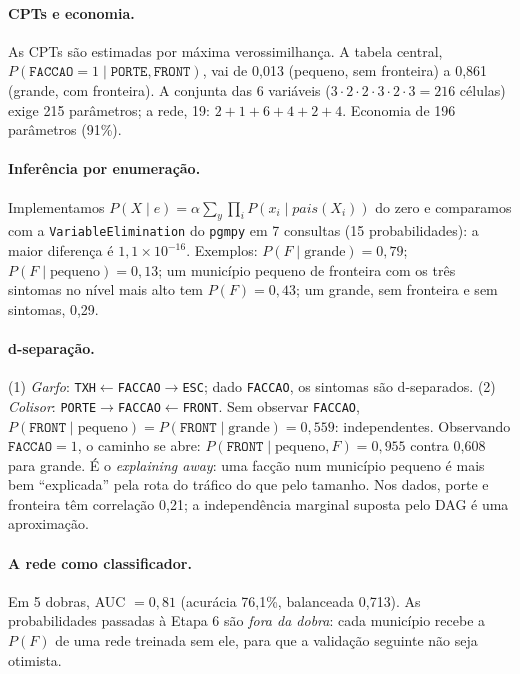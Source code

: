 \documentclass[article,12pt,oneside,a4paper,brazil,sumario=tradicional]{abntex2}
\newcommand{\F}{\texttt{FACCAO}}
\begin{document}
\paragraph{CPTs e economia.} As CPTs são estimadas por máxima verossimilhança. A tabela
central, $P(\F{=}1\mid\texttt{PORTE},\texttt{FRONT})$, vai de 0,013 (pequeno, sem fronteira)
a 0,861 (grande, com fronteira). A conjunta das 6 variáveis ($3\cdot2\cdot2\cdot3\cdot2\cdot3=216$
células) exige 215 parâmetros; a rede, 19: $2+1+6+4+2+4$. Economia de 196 parâmetros (91\%).

\paragraph{Inferência por enumeração.} Implementamos
$P(X\mid e)=\alpha\sum_y\prod_i P(x_i\mid pais(X_i))$ do zero e comparamos com a
\texttt{VariableElimination} do \texttt{pgmpy} em 7 consultas (15 probabilidades): a maior
diferença é $1{,}1\times10^{-16}$. Exemplos: $P(F\mid\text{grande})=0{,}79$;
$P(F\mid\text{pequeno})=0{,}13$; um município pequeno de fronteira com os três sintomas no
nível mais alto tem $P(F)=0{,}43$; um grande, sem fronteira e sem sintomas, 0,29.

\paragraph{d-separação.} (1) \emph{Garfo}: \texttt{TXH}$\leftarrow$\F$\rightarrow$\texttt{ESC};
dado \F, os sintomas são d-separados. (2) \emph{Colisor}:
\texttt{PORTE}$\rightarrow$\F$\leftarrow$\texttt{FRONT}. Sem observar \F,
$P(\texttt{FRONT}\mid\text{pequeno})=P(\texttt{FRONT}\mid\text{grande})=0{,}559$:
independentes. Observando $\F{=}1$, o caminho se abre:
$P(\texttt{FRONT}\mid\text{pequeno},F)=0{,}955$ contra 0,608 para grande. É o
\emph{explaining away}: uma facção num município pequeno é mais bem ``explicada'' pela rota
do tráfico do que pelo tamanho. Nos dados, porte e fronteira têm correlação 0,21; a
independência marginal suposta pelo DAG é uma aproximação.

\paragraph{A rede como classificador.} Em 5 dobras, AUC $=0{,}81$ (acurácia 76,1\%,
balanceada 0,713). As probabilidades passadas à Etapa 6 são \emph{fora da dobra}: cada
município recebe a $P(F)$ de uma rede treinada sem ele, para que a validação seguinte não
seja otimista.
\end{document}
